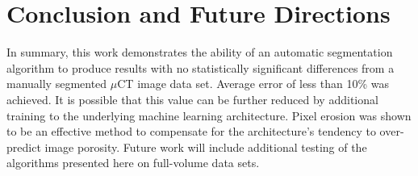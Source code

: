 \documentclass[11pt, twocolumn]{article}
\begin{document}
\section{Conclusion and Future Directions} 

In summary, this work demonstrates the ability of an automatic segmentation algorithm to produce results with no statistically significant differences from a manually segmented $\mu$CT image data set. Average error of less than 10\% was achieved. It is possible that this value can be further reduced by additional training to the underlying machine learning architecture. Pixel erosion was shown to be an effective method to compensate for the architecture's tendency to over-predict image porosity. Future work will include additional testing of the algorithms presented here on full-volume data sets.



\end{document}
